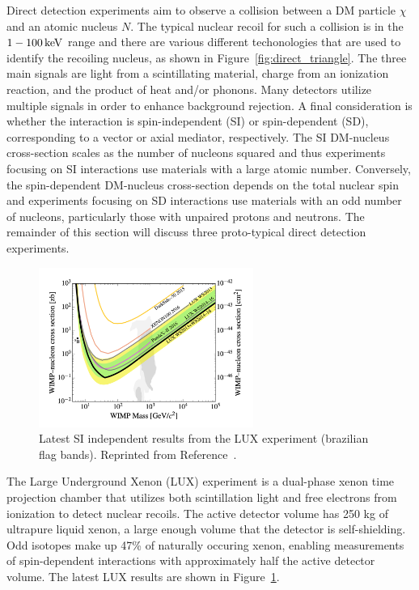 Direct detection experiments aim to observe a collision between a DM particle $\chi$ and an atomic nucleus $N$.
The typical nuclear recoil for such a collision is in the $1-100\,\text{ke\hspace{-.08em}V}$ range and there are various different techonologies that are used to identify the recoiling nucleus, as shown in Figure~\ref{fig:direct_triangle}.
The three main signals are light from a scintillating material, charge from an ionization reaction, and the product of heat and/or phonons.
Many detectors utilize multiple signals in order to enhance background rejection.
A final consideration is whether the interaction is spin-independent (SI) or spin-dependent (SD), corresponding to a vector or axial mediator, respectively. 
The SI DM-nucleus cross-section scales as the number of nucleons squared and thus experiments focusing on SI interactions use materials with a large atomic number.
Conversely, the spin-dependent DM-nucleus cross-section depends on the total nuclear spin and experiments focusing on SD interactions use materials with an odd number of nucleons, particularly those with unpaired protons and neutrons.
The remainder of this section will discuss three proto-typical direct detection experiments.

\begin{figure}[htbp]
  \centering
  \includegraphics[width=0.625\textwidth]{DarkMatter/Figures/lux.png}
  \caption{
    Latest SI independent results from the LUX experiment (brazilian flag bands).
    Reprinted from Reference~\cite{}. %
  }
  \label{fig:dm_lux}
\end{figure}

The Large Underground Xenon (LUX) experiment is a  dual-phase xenon time projection chamber that utilizes both scintillation light and free electrons from ionization to detect nuclear recoils.
The active detector volume has 250 kg of ultrapure liquid xenon, a large enough volume that the detector is self-shielding.
Odd isotopes make up 47\% of naturally occuring xenon, enabling measurements of spin-dependent interactions with approximately half the active detector volume.
The latest LUX results are shown in Figure~\ref{fig:dm_lux}.

